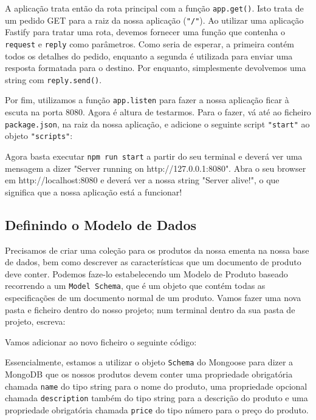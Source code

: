 A aplicação trata então da rota principal com a função \texttt{app.get()}. Isto trata de um pedido GET para a raiz da nossa aplicação (\texttt{"/"}). Ao utilizar uma aplicação Fastify para tratar uma rota, devemos fornecer uma função que contenha o \texttt{request} e \texttt{reply} como parâmetros. Como seria de esperar, a primeira contém todos os detalhes do pedido, enquanto a segunda é utilizada para enviar uma resposta formatada para o destino. Por enquanto, simplesmente devolvemos uma string com \texttt{reply.send()}.

Por fim, utilizamos a função \texttt{app.listen} para fazer a nossa aplicação ficar à escuta na porta 8080. Agora é altura de testarmos. Para o fazer, vá até ao ficheiro \texttt{package.json}, na raiz da nossa aplicação, e adicione o seguinte script \texttt{"start"} ao objeto \texttt{"scripts"}:



Agora basta executar \texttt{npm run start} a partir do seu terminal e deverá ver uma mensagem a dizer "Server running on http://127.0.0.1:8080". Abra o seu browser em http://localhost:8080 e deverá ver a nossa string "Server alive!", o que significa que a nossa aplicação está a funcionar!

\subsection{Definindo o Modelo de Dados}

Precisamos de criar uma coleção para os produtos da nossa ementa na nossa base de dados, bem como descrever as características que um documento de produto deve conter. Podemos faze-lo estabelecendo um Modelo de Produto baseado recorrendo a um \texttt{Model Schema}, que é um objeto que contém todas as especificações de um documento normal de um produto. Vamos fazer uma nova pasta e ficheiro dentro do nosso projeto; num terminal dentro da sua pasta de projeto, escreva:



Vamos adicionar ao novo ficheiro o seguinte código:



Essencialmente, estamos a utilizar o objeto \texttt{Schema} do Mongoose para dizer a MongoDB que os nossos produtos devem conter uma propriedade obrigatória chamada \texttt{name} do tipo string para o nome do produto, uma propriedade opcional chamada \texttt{description} também do tipo string para a descrição do produto e uma propriedade obrigatória chamada \texttt{price} do tipo número para o preço do produto.

